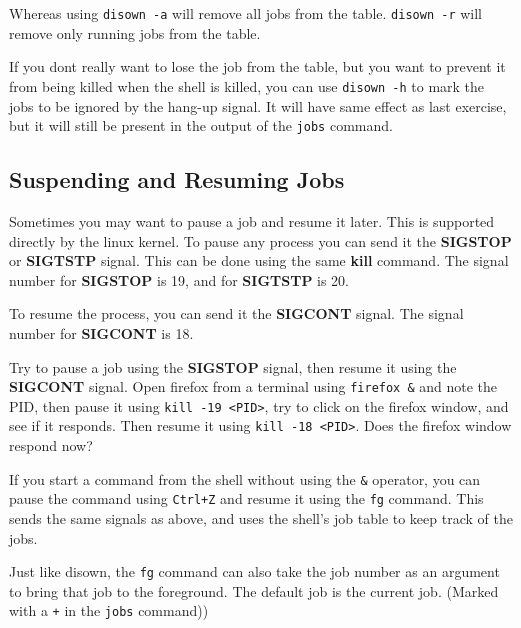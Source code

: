 Whereas using \lstinline|disown -a| will remove all jobs from the table.
\lstinline|disown -r| will remove only running jobs from the table.

If you dont really want to lose the job from the table, but you want to
prevent it from being killed when the shell is killed, you can use
\lstinline|disown -h| to mark the jobs to be ignored by the hang-up signal.
It will have same effect as last exercise, but it will still be present
in the output of the \lstinline|jobs| command.

\subsection{Suspending and Resuming Jobs}

Sometimes you may want to pause a job and resume it later.
This is supported directly by the linux kernel.
To pause any process you can send it the \textbf{SIGSTOP} or \textbf{SIGTSTP} signal.
This can be done using the same \textbf{kill} command. The signal number for
\textbf{SIGSTOP} is 19, and for \textbf{SIGTSTP} is 20.

To resume the process, you can send it the \textbf{SIGCONT} signal.
The signal number for \textbf{SIGCONT} is 18.

\begin{exercise}
  Try to pause a job using the \textbf{SIGSTOP} signal, then resume it using the
  \textbf{SIGCONT} signal.
  Open firefox from a terminal using \lstinline|firefox &| and note the PID,
  then pause it using
  \lstinline|kill -19 <PID>|,
  try to click on the firefox window, and see if it responds.
  Then resume it using \lstinline|kill -18 <PID>|.
  Does the firefox window respond now?
\end{exercise}

If you start a command from the shell without using the \lstinline|&| operator,
you can pause the command using \lstinline|Ctrl+Z| and resume it using the
\lstinline|fg| command.
This sends the same signals as above, and uses the shell's job table
to keep track of the jobs.

\begin{remark}
  Just like disown, the \lstinline|fg| command can also take the job number
  as an argument to bring that job to the foreground. The default job
  is the current job. (Marked with a \lstinline|+| in the \lstinline|jobs| command))
\end{remark}

